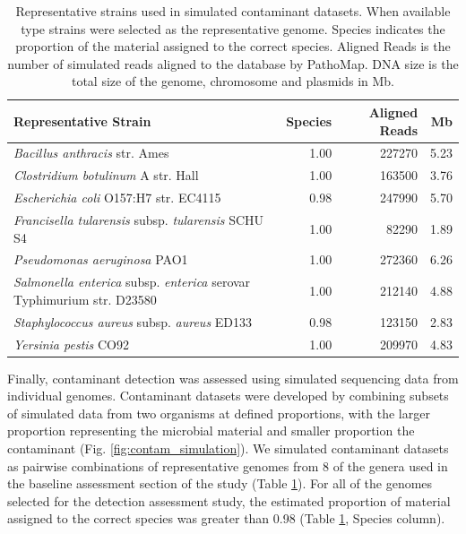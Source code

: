 \documentclass[fleqn,10pt,lineno]{wlpeerj}\usepackage[]{graphicx}\usepackage[]{color}
\begin{document}
\begin{table}[ht]
\centering
\begin{tabular}{lrrr}
  \hline
Representative Strain & Species & Aligned Reads & Mb \\ 
  \hline
\textit{Bacillus anthracis} str. Ames & 1.00 & 227270 & 5.23 \\ 
  \textit{Clostridium botulinum} A str. Hall & 1.00 & 163500 & 3.76 \\ 
  \textit{Escherichia coli} O157:H7 str. EC4115 & 0.98 & 247990 & 5.70 \\ 
  \textit{Francisella tularensis} subsp. \textit{tularensis} SCHU S4 & 1.00 & 82290 & 1.89 \\ 
  \textit{Pseudomonas aeruginosa} PAO1 & 1.00 & 272360 & 6.26 \\ 
  \textit{Salmonella enterica} subsp. \textit{enterica} serovar Typhimurium str. D23580 & 1.00 & 212140 & 4.88 \\ 
  \textit{Staphylococcus aureus} subsp. \textit{aureus} ED133 & 0.98 & 123150 & 2.83 \\ 
  \textit{Yersinia pestis} CO92 & 1.00 & 209970 & 4.83 \\ 
   \hline
\end{tabular}
\caption{Representative strains used in simulated contaminant datasets. When available type strains were selected as the representative genome. Species indicates the proportion of the material assigned to the correct species. Aligned Reads is the number of simulated reads aligned to the database by PathoMap. DNA size is the total size of the genome, chromosome and plasmids in Mb.} 
\label{tab:contam_table}
\end{table}



Finally, contaminant detection was assessed using simulated sequencing data from individual genomes.
Contaminant datasets were developed by combining subsets of simulated data from two organisms at defined proportions,
with the larger proportion representing the microbial material and smaller proportion the contaminant (Fig. \ref{fig:contam_simulation}).
We simulated contaminant datasets as pairwise combinations of representative genomes from 8 of the genera used in the baseline assessment section of the study (Table \ref{tab:contam_table}).
For all of the genomes selected for the detection assessment study, the estimated proportion of material assigned to the correct species was greater than 0.98 (Table \ref{tab:contam_table}, Species column).
\end{document}
